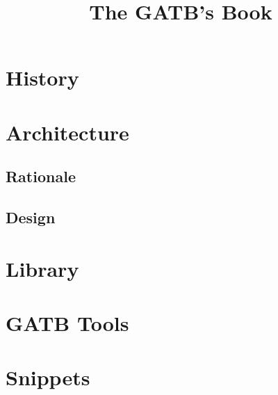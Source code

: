 \documentclass{book}
\begin{document}

\title{The GATB's Book}

\chapter{History}

\chapter{Architecture}

\section{Rationale}
\section{Design}


\chapter{Library}

\chapter{GATB Tools}

\chapter{Snippets}
\end{document}
